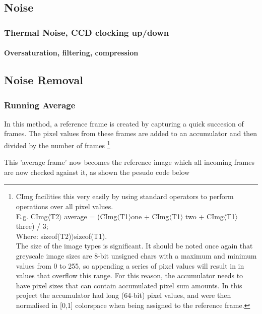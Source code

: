 \subsection{Noise}
\subsubsection{Thermal Noise, CCD clocking up/down}
\paragraph{Oversaturation, filtering, compression}

\subsection {Noise Removal}
\subsubsection{Running Average}
In this method, a reference frame is created by capturing a quick succesion of frames. The pixel values from these frames are added to an accumulator and then divided by the number of frames  
\footnote{CImg facilities this very easily by using standard operators to perform operations over all pixel values.
\\ E.g.  CImg\(\langle\)T2\(\rangle\) average =  (CImg\(\langle\)T1\(\rangle\)one + CImg\(\langle\)T1\(\rangle\) two + CImg\(\langle\)T1\(\rangle\) three) / 3; \\
Where: sizeof(T2)\(\rangle\)sizeof(T1).
\\The size of the image types is significant. It should be noted once again that greyscale image sizes are 8-bit unsigned chars with a maximum and minimum values from 0 to 255, so appending a series of pixel values will result in in values that overflow this range. For this reason, the accumulator needs to have pixel sizes that can contain accumulated pixel sum amounts. In this project the accumulator had long (64-bit) pixel values, and were then normalised in [0,1] colorspace when being assigned to the reference frame.}
 
This 'average frame' now becomes the reference image which all incoming frames are now checked against it, as shown the pesudo code below

\begin{frame}[fragile]
	\vspace{-20pt}
	
\end{frame}

